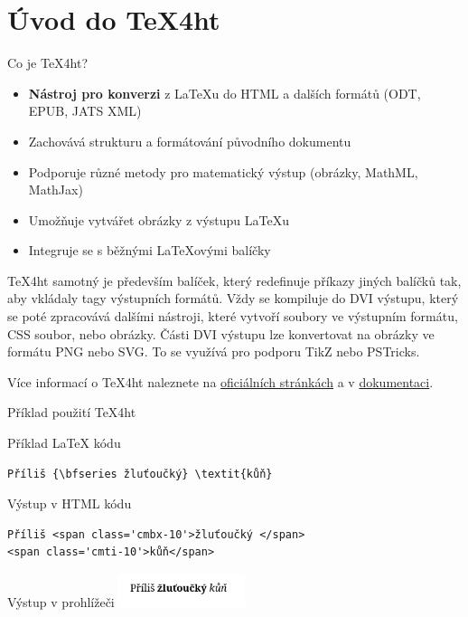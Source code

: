 \section{Úvod do TeX4ht}

\begin{frame}{Co je TeX4ht?}
\begin{itemize}
    \item \textbf{Nástroj pro konverzi} z LaTeXu do HTML a dalších formátů (ODT, EPUB, JATS XML)
    \item Zachovává strukturu a formátování původního dokumentu
    \item Podporuje různé metody pro matematický výstup (obrázky, MathML, MathJax)
    \item Umožňuje vytvářet obrázky z výstupu \LaTeX u
    \item Integruje se s běžnými LaTeXovými balíčky
\end{itemize}
\end{frame}

\TeX4ht samotný je především balíček, který redefinuje příkazy jiných balíčků tak, aby
vkládaly tagy výstupních formátů. Vždy se kompiluje do DVI výstupu, který se poté zpracovává
dalšími nástroji, které vytvoří soubory ve výstupním formátu, CSS soubor, nebo obrázky.
Části DVI výstupu lze konvertovat na obrázky ve formátu PNG nebo SVG. To se využívá pro podporu
TikZ nebo PSTricks.

Více informací o \TeX4ht naleznete na  \href{https://www.tug.org/tex4ht/}{oficiálních stránkách}
a v \href{https://www.kodymirus.cz/tex4ht-doc/tex4ht-doc.html}{dokumentaci}.

\begin{frame}[fragile]{Příklad použití TeX4ht}


\begin{block}{Příklad LaTeX kódu}
\begin{verbatim}
Příliš {\bfseries žluťoučký} \textit{kůň}
\end{verbatim}
\end{block}



\begin{block}{Výstup v HTML kódu}
\begin{verbatim}
Příliš <span class='cmbx-10'>žluťoučký </span>
<span class='cmti-10'>kůň</span>
\end{verbatim}
\end{block}

\begin{block}{Výstup v prohlížeči}
  \includegraphics[width=10em]{img/basic.png} 
\end{block}

\end{frame}

